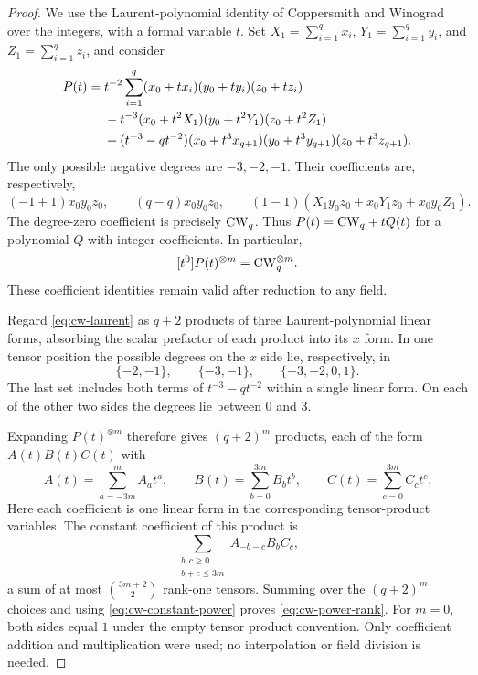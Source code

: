 \begin{proof}
We use the Laurent-polynomial identity of Coppersmith and
Winograd~\cite[Section~7, equation~(10)]{CoppersmithWinograd1990}
over the integers, with a formal variable $t$. Set
$X_1=\sum_{i=1}^q x_i$, $Y_1=\sum_{i=1}^q y_i$, and
$Z_1=\sum_{i=1}^q z_i$, and consider
\begin{align}
 P(t)={}&t^{-2}\sum_{i=1}^q
        (x_0+tx_i)(y_0+ty_i)(z_0+tz_i)\notag\\
 &-t^{-3}(x_0+t^2X_1)(y_0+t^2Y_1)(z_0+t^2Z_1)\notag\\
 &+(t^{-3}-qt^{-2})
        (x_0+t^3x_{q+1})(y_0+t^3y_{q+1})(z_0+t^3z_{q+1}).
        \label{eq:cw-laurent}
\end{align}
The only possible negative degrees are $-3,-2,-1$.  Their
coefficients are, respectively,
\[
 (-1+1)x_0y_0z_0,\qquad
 (q-q)x_0y_0z_0,\qquad
 (1-1)(X_1y_0z_0+x_0Y_1z_0+x_0y_0Z_1).
\]
The degree-zero coefficient is precisely $\mathrm{CW}_q$.  Thus
$P(t)=\mathrm{CW}_q+tQ(t)$ for a polynomial $Q$ with integer coefficients.
In particular,
\begin{equation}\label{eq:cw-constant-power}
 [t^0]P(t)^{\otimes m}=\mathrm{CW}_q^{\otimes m}.
\end{equation}
These coefficient identities remain valid after reduction to any field.

Regard \eqref{eq:cw-laurent} as $q+2$ products of three
Laurent-polynomial linear forms, absorbing the scalar prefactor of
each product into its $x$ form.  In one tensor position the possible
degrees on the $x$ side lie, respectively, in
\[
 \{-2,-1\},\qquad\{-3,-1\},\qquad\{-3,-2,0,1\}.
\]
The last set includes both terms of $t^{-3}-qt^{-2}$ within a single
linear form.  On each of the other two sides the degrees lie between
$0$ and $3$.

Expanding $P(t)^{\otimes m}$ therefore gives $(q+2)^m$ products,
each of the form $A(t)B(t)C(t)$ with
\[
 A(t)=\sum_{a=-3m}^{m}A_at^a,\qquad
 B(t)=\sum_{b=0}^{3m}B_bt^b,\qquad
 C(t)=\sum_{c=0}^{3m}C_ct^c.
\]
Here each coefficient is one linear form in the corresponding
tensor-product variables.  The constant coefficient of this product
is
\[
 \sum_{\substack{b,c\geq0\\b+c\leq3m}}
       A_{-b-c}B_bC_c,
\]
a sum of at most $\binom{3m+2}{2}$ rank-one tensors.  Summing over
the $(q+2)^m$ choices and using \eqref{eq:cw-constant-power} proves
\eqref{eq:cw-power-rank}.  For $m=0$, both sides equal $1$ under
the empty tensor product convention.  Only coefficient addition and
multiplication were used; no interpolation or field division is needed.
\end{proof}

